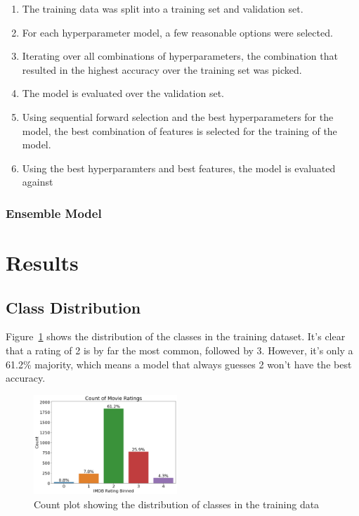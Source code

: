 \documentclass[11pt]{article}
\begin{document}
\begin{enumerate}
    \item The training data was split into a training set and validation set.
    \item For each hyperparameter model, a few reasonable options were selected.
    \item Iterating over all combinations of hyperparameters, the combination that resulted in the highest accuracy over the training set was picked.
    \item The model is evaluated over the validation set.
    \item Using sequential forward selection and the best hyperparameters for the model, the best combination of features is selected for the training of the model. 
    \item Using the best hyperparamters and best features, the model is evaluated against 

\end{enumerate}

\subsubsection{Ensemble Model}



\section{Results}

\subsection{Class Distribution}
Figure~\ref{fig:class-dist} shows the distribution of the classes in the training dataset. It's clear that a rating of 2 is by far the most common, followed by 3. However, it's only a 61.2\% majority, which means a model that always guesses 2 won't have the best accuracy.

\begin{figure}[!ht]
	\centering
	\includegraphics[width = 0.48\textwidth]{res/class-dist.png}
	\caption{Count plot showing the distribution of classes in the training data}
	\label{fig:class-dist}
\end{figure}
\end{document}
